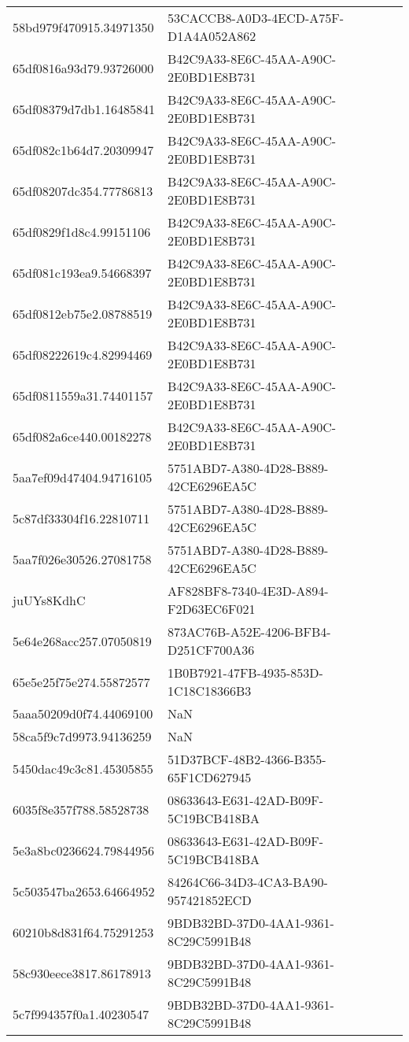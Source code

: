 \begin{tabular}{ll}
58bd979f470915.34971350 & 53CACCB8-A0D3-4ECD-A75F-D1A4A052A862 \\
65df0816a93d79.93726000 & B42C9A33-8E6C-45AA-A90C-2E0BD1E8B731 \\
65df08379d7db1.16485841 & B42C9A33-8E6C-45AA-A90C-2E0BD1E8B731 \\
65df082c1b64d7.20309947 & B42C9A33-8E6C-45AA-A90C-2E0BD1E8B731 \\
65df08207dc354.77786813 & B42C9A33-8E6C-45AA-A90C-2E0BD1E8B731 \\
65df0829f1d8c4.99151106 & B42C9A33-8E6C-45AA-A90C-2E0BD1E8B731 \\
65df081c193ea9.54668397 & B42C9A33-8E6C-45AA-A90C-2E0BD1E8B731 \\
65df0812eb75e2.08788519 & B42C9A33-8E6C-45AA-A90C-2E0BD1E8B731 \\
65df08222619c4.82994469 & B42C9A33-8E6C-45AA-A90C-2E0BD1E8B731 \\
65df0811559a31.74401157 & B42C9A33-8E6C-45AA-A90C-2E0BD1E8B731 \\
65df082a6ce440.00182278 & B42C9A33-8E6C-45AA-A90C-2E0BD1E8B731 \\
5aa7ef09d47404.94716105 & 5751ABD7-A380-4D28-B889-42CE6296EA5C \\
5c87df33304f16.22810711 & 5751ABD7-A380-4D28-B889-42CE6296EA5C \\
5aa7f026e30526.27081758 & 5751ABD7-A380-4D28-B889-42CE6296EA5C \\
juUYs8KdhC & AF828BF8-7340-4E3D-A894-F2D63EC6F021 \\
5e64e268acc257.07050819 & 873AC76B-A52E-4206-BFB4-D251CF700A36 \\
65e5e25f75e274.55872577 & 1B0B7921-47FB-4935-853D-1C18C18366B3 \\
5aaa50209d0f74.44069100 & NaN \\
58ca5f9c7d9973.94136259 & NaN \\
5450dac49c3c81.45305855 & 51D37BCF-48B2-4366-B355-65F1CD627945 \\
6035f8e357f788.58528738 & 08633643-E631-42AD-B09F-5C19BCB418BA \\
5e3a8bc0236624.79844956 & 08633643-E631-42AD-B09F-5C19BCB418BA \\
5c503547ba2653.64664952 & 84264C66-34D3-4CA3-BA90-957421852ECD \\
60210b8d831f64.75291253 & 9BDB32BD-37D0-4AA1-9361-8C29C5991B48 \\
58c930eece3817.86178913 & 9BDB32BD-37D0-4AA1-9361-8C29C5991B48 \\
5c7f994357f0a1.40230547 & 9BDB32BD-37D0-4AA1-9361-8C29C5991B48 \\

\end{tabular}
